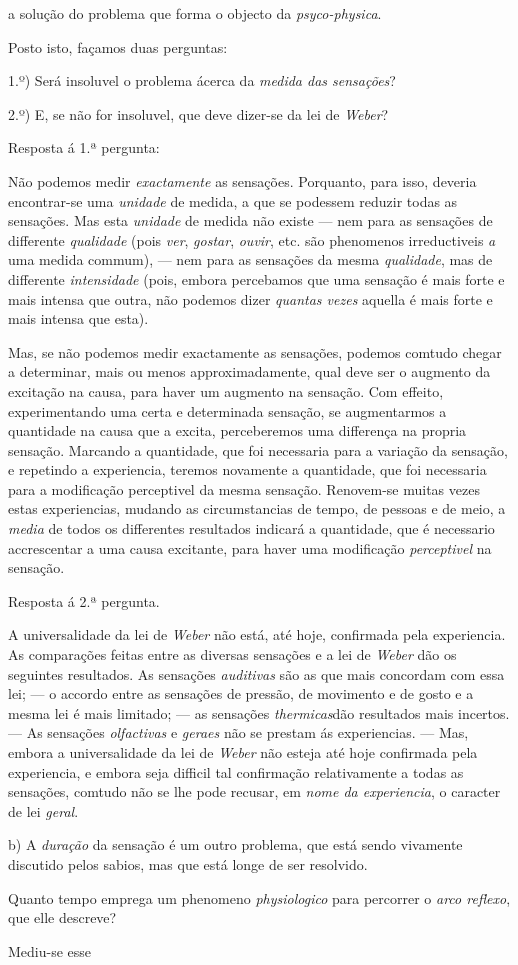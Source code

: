 a solução do problema que forma o objecto da \emph{psyco-physica}.\par Posto isto, façamos duas perguntas:\par 1.º) Será insoluvel o problema ácerca da \emph{medida das sensações}?\par 2.º) E, se não for insoluvel, que deve dizer-se da lei de \emph{Weber}?\par Resposta á 1.ª pergunta:\par Não podemos medir \emph{exactamente} as sensações. Porquanto, para isso, deveria encontrar-se uma \emph{unidade} de medida, a que se podessem reduzir todas as sensações. Mas esta \emph{unidade} de medida não existe --- nem para as sensações de differente \emph{qualidade} (pois \emph{ver}, \emph{gostar}, \emph{ouvir}, etc. são phenomenos irreductiveis \emph{a} uma medida commum), --- nem para as sensações da mesma \emph{qualidade}, mas de differente \emph{intensidade} (pois, embora percebamos que uma sensação é mais forte e mais intensa que outra, não podemos dizer \emph{quantas vezes} aquella é mais forte e mais intensa que esta).\par Mas, se não podemos medir exactamente as sensações, podemos comtudo chegar a determinar, mais ou menos approximadamente, qual deve ser o augmento da excitação na causa, para haver um augmento na sensação. Com effeito, experimentando uma certa e determinada sensação, se augmentarmos a quantidade na causa que a excita, perceberemos uma differença na propria sensação. Marcando a quantidade, que foi necessaria para a variação da sensação, e repetindo a experiencia, teremos novamente a quantidade, que foi necessaria para a modificação perceptivel da mesma sensação. Renovem-se muitas vezes estas experiencias, mudando as circumstancias de tempo, de pessoas e de meio, a \emph{media} de todos os differentes resultados indicará a quantidade, que é necessario accrescentar a uma causa excitante, para haver uma modificação \emph{perceptivel} na sensação.\par Resposta á 2.ª pergunta.\par A universalidade da lei de \emph{Weber} não está, até hoje, confirmada pela experiencia. As comparações feitas entre as diversas sensações e a lei de \emph{Weber} dão os seguintes resultados. As sensações \emph{auditivas} são as que mais concordam com essa lei; --- o accordo entre as sensações de pressão, de movimento e de gosto e a mesma lei é mais limitado; --- as sensações \emph{thermicas}dão resultados mais incertos. --- As sensações \emph{olfactivas} e \emph{geraes} não se prestam ás experiencias. --- Mas, embora a universalidade da lei de \emph{Weber} não esteja até hoje confirmada pela experiencia, e embora seja difficil tal confirmação relativamente a todas as sensações, comtudo não se lhe pode recusar, em \emph{nome da experiencia}, o caracter de lei \emph{geral}.\par b) A \emph{duração} da sensação é um outro problema, que está sendo vivamente discutido pelos sabios, mas que está longe de ser resolvido.\par Quanto tempo emprega um phenomeno \emph{physiologico} para percorrer o \emph{arco reflexo}, que elle descreve?\par Mediu-se esse 